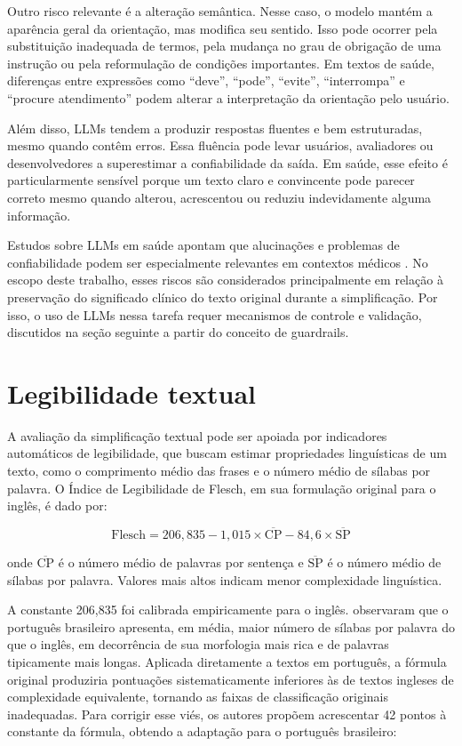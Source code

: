 Outro risco relevante é a alteração semântica. Nesse caso, o modelo mantém a aparência geral da orientação, mas modifica seu sentido. Isso pode ocorrer pela substituição inadequada de termos, pela mudança no grau de obrigação de uma instrução ou pela reformulação de condições importantes. Em textos de saúde, diferenças entre expressões como ``deve'', ``pode'', ``evite'', ``interrompa'' e ``procure atendimento'' podem alterar a interpretação da orientação pelo usuário.

Além disso, LLMs tendem a produzir respostas fluentes e bem estruturadas, mesmo quando contêm erros. Essa fluência pode levar usuários, avaliadores ou desenvolvedores a superestimar a confiabilidade da saída. Em saúde, esse efeito é particularmente sensível porque um texto claro e convincente pode parecer correto mesmo quando alterou, acrescentou ou reduziu indevidamente alguma informação.

Estudos sobre LLMs em saúde apontam que alucinações e problemas de confiabilidade podem ser especialmente relevantes em contextos médicos \cite{aydin2024llms,gangavarapu2024healthcare}. No escopo deste trabalho, esses riscos são considerados principalmente em relação à preservação do significado clínico do texto original durante a simplificação. Por isso, o uso de LLMs nessa tarefa requer mecanismos de controle e validação, discutidos na seção seguinte a partir do conceito de guardrails.

\section{Legibilidade textual}
\label{sec:legibilidade-textual}

A avaliação da simplificação textual pode ser apoiada por indicadores automáticos de legibilidade, que buscam estimar propriedades linguísticas de um texto, como o comprimento médio das frases e o número médio de sílabas por palavra. O Índice de Legibilidade de Flesch, em sua formulação original para o inglês, é dado por:

\[
  \text{Flesch} = 206{,}835 - 1{,}015 \times \overline{\text{CP}} - 84{,}6 \times \overline{\text{SP}}
\]

onde $\overline{\text{CP}}$ é o número médio de palavras por sentença e $\overline{\text{SP}}$ é o número médio de sílabas por palavra. Valores mais altos indicam menor complexidade linguística.

A constante 206,835 foi calibrada empiricamente para o inglês.  observaram que o português brasileiro apresenta, em média, maior número de sílabas por palavra do que o inglês, em decorrência de sua morfologia mais rica e de palavras tipicamente mais longas. Aplicada diretamente a textos em português, a fórmula original produziria pontuações sistematicamente inferiores às de textos ingleses de complexidade equivalente, tornando as faixas de classificação originais inadequadas. Para corrigir esse viés, os autores propõem acrescentar 42 pontos à constante da fórmula, obtendo a adaptação para o português brasileiro:

